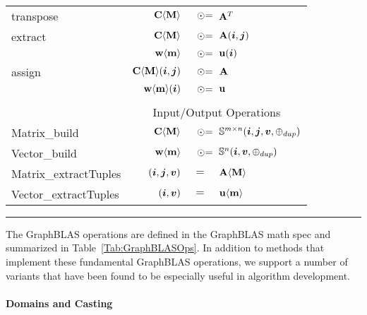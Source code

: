 \begin{table*}[h]
\begin{center}
\begin{tabular}{l|rrl}
{\sf transpose}    & ${\bf C}\langle{\bf M}\rangle$ & $\odotequals$ & ${\bf A}^T$ \\
{\sf extract}      & ${\bf C}\langle{\bf M}\rangle$ & $\odotequals$ & ${\bf A}(\bm{i},\bm{j})$ \\
                   & ${\bf w}\langle{\bf m}\rangle$ & $\odotequals$ & ${\bf u}(\bm{i})$ \\
{\sf assign}       & ${\bf C}\langle{\bf M}\rangle(\bm{i},\bm{j})$ & $\odotequals$ & ${\bf A}$ \\
                   & ${\bf w}\langle{\bf m}\rangle(\bm{i})$ & $\odotequals$ & ${\bf u}$ \\
& & & \\
& \multicolumn{3}{c}{Input/Output Operations} \\
{\sf Matrix\_build}  & ${\bf C}\langle{\bf M}\rangle$ & $\odotequals$ & $\mathbb{S}^{m\times n}(\bm{i},\bm{j},\bm{v},\oplus_{dup})$ \\
{\sf Vector\_build}  & ${\bf w}\langle{\bf m}\rangle$ & $\odotequals$ & $\mathbb{S}^{n}(\bm{i},\bm{v},\oplus_{dup})$ \\
{\sf Matrix\_extractTuples} & $(\bm{i},\bm{j},\bm{v})$ & $=$ & ${\bf A}\langle{\bf M}\rangle$ \\
{\sf Vector\_extractTuples} & $(\bm{i},\bm{v})$ & $=$ & ${\bf u}\langle{\bf m}\rangle$ \\
\end{tabular}
\end{center}
\hrule
\end{table*}

The GraphBLAS operations are defined in the GraphBLAS math spec and summarized in 
Table~\ref{Tab:GraphBLASOps}.   In addition to methods that implement these
fundamental GraphBLAS operations, we support a number of variants that have been 
found to be especially useful in algorithm development.


%


\paragraph{Domains and Casting}

